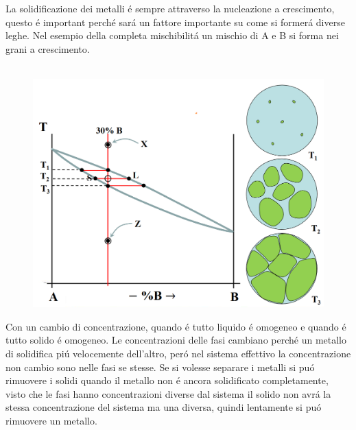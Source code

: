\documentclass{article}
\begin{document}
{\begin{figure}[!h]
        \end{figure}
        La solidificazione dei metalli \'e sempre attraverso la nucleazione a crescimento, questo \'e important perch\'e sar\'a un fattore importante su come si former\'a diverse leghe. Nel esempio della completa mischibilit\'a un mischio di A e B si forma nei grani a crescimento. \\ \\
        \begin{figure}[!h]
            \centering
            \includegraphics[width=.85\linewidth]{Cambio nel sistema completamente miscibile a 30pc B.png}
        \end{figure}
        Con un cambio di concentrazione, quando \'e tutto liquido \'e omogeneo e quando \'e tutto solido \'e omogeneo.
        Le concentrazioni delle fasi cambiano perch\'e un metallo di solidifica pi\'u velocemente dell'altro, per\'o nel sistema effettivo la concentrazione non cambio sono nelle fasi se stesse. Se si volesse separare i metalli si pu\'o rimuovere i solidi quando il metallo non \'e ancora solidificato completamente, visto che le fasi hanno concentrazioni diverse dal sistema il solido non avr\'a la stessa concentrazione del sistema ma una diversa, quindi lentamente si pu\'o rimuovere un metallo.
}
\end{document}
